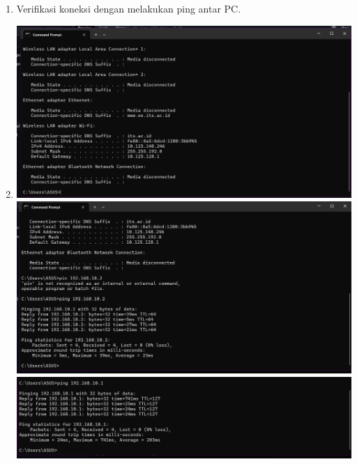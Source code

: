 \begin{enumerate}
\begin{enumerate}
\begin{center}
        \end{center}
        \item Verifikasi koneksi dengan melakukan ping antar PC.
        \item \begin{center}
            \includegraphics[scale=0.3]{P1/img/13 ipconfig.png}
            \includegraphics[scale=0.3]{P1/img/14 ping 192.168.10.2.png}    
            \includegraphics[scale=0.3]{P1/img/15 ping 192.168.10.1.png}       
        \end{center}


\end{enumerate}
\end{enumerate}
